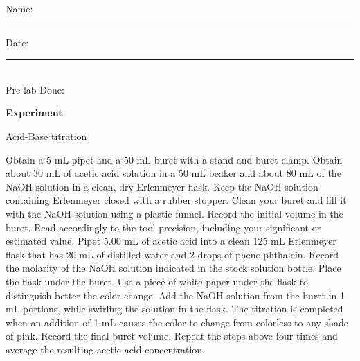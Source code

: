 \documentclass[main.tex]{subfiles}
\begin{document}
\begin{fullwidth}
\begin{enumerate}
\end{enumerate}


\clearpage\thispagestyle{empty}\mbox{}\clearpage



\begin{multicols}{2}
\begin{tcolorbox}[enhanced jigsaw,breakable,size=title,
colback=mybrown!05,colframe=black,fonttitle=\bfseries,
title=STUDENT INFO,pad at break=1mm, break at=15cm/0pt ]
\vspace{0.2cm}
\noindent Name: \rule{5cm}{0.4pt}Date:\rule{1cm}{0.4pt}\\
Pre-lab Done: \quad
\end{tcolorbox}
\end{multicols}
\hfill
\vspace{0.2cm}
\begin{center}
{\large \bfseries 
Experiment
\par
\Huge
Acid-Base titration
\\[5pt] \par}
\vspace{0.2cm}
\end{center}
\par
\noindent
\uline{  \hfill \normalsize \hfill       }

\vspace{0.2cm}{\large \bfseries 1. Acetic acid titration}

\begin{steps}
      \newstep[] Obtain a 5 mL pipet and a 50 mL buret with a stand and buret clamp.
    \newstep[] Obtain about 30 mL of acetic acid solution in a 50 mL beaker and about 80 mL of the NaOH solution in a clean, dry Erlenmeyer flask. Keep the NaOH solution containing Erlenmeyer closed with a rubber stopper. 
    \newstep[] Clean your buret and fill it with the NaOH solution using a plastic funnel. 
    \newstep[] Record the initial volume in the buret. Read accordingly to the tool precision, including your significant or estimated value.
  \newstep[] Pipet 5.00 mL of acetic acid into a clean 125 mL Erlenmeyer flask that has 20 mL of distilled water and 2 drops of phenolphthalein. 
       \newstep[] Record the molarity of the NaOH solution indicated in the stock solution bottle.
       \newstep[] Place the flask under the buret. Use a piece of white paper under the flask to distinguish better the color change.
       \newstep[] Add the NaOH solution from the buret in 1 mL portions, while swirling the solution in the flask. 
       \newstep[] The titration is completed when an addition of 1 mL causes the color to change from colorless to any shade of pink.
       \newstep[] Record the final buret volume.
              \newstep[] Repeat the steps above four times and average the resulting acetic acid concentration.


\end{steps}
\end{fullwidth}
\end{document}
